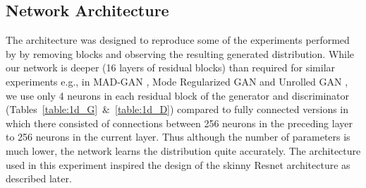 \subsection{Network Architecture}
The architecture was designed to reproduce some of the experiments performed by \cite{veit2016residual} by removing blocks and observing the resulting generated distribution.
While our network is deeper (16 layers of residual blocks) than required for similar experiments e.g., in MAD-GAN \cite{ghosh2017multi}, Mode Regularized GAN \cite{che2016mode} and Unrolled GAN \cite{metz2017unrolledGAN}, we use only 4 neurons in each residual block of the generator and discriminator (Tables~\ref{table:1d_G}~\&~\ref{table:1d_D}) compared to fully connected versions in which there consisted of connections between 256 neurons in the preceding layer to 256 neurons in the current layer. Thus although the number of parameters is much lower, the network learns the distribution quite accurately. The architecture used in this experiment inspired the design of the skinny Resnet architecture as described later.



